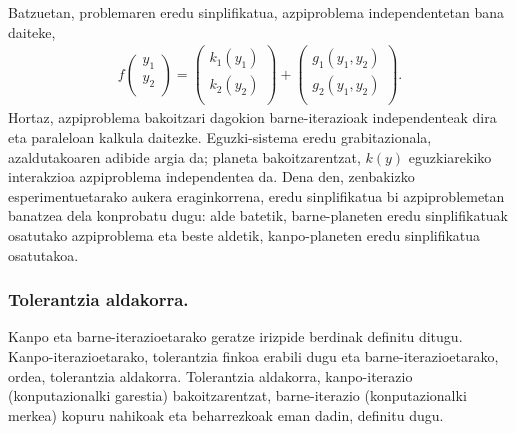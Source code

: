 Batzuetan, problemaren eredu sinplifikatua, azpiproblema independentetan bana daiteke,
\begin{align*}
f\left ( \begin{array}{c}
   y_1 \\
   y_2 \\
\end{array} \right)=
\left ( \begin{array}{c}
   k_1(y_1) \\
   k_2(y_2) \\
\end{array} \right)+
\left ( \begin{array}{c}
   g_1(y_1,y_2) \\
   g_2(y_1,y_2) \\
\end{array} \right).
\end{align*}
%
Hortaz, azpiproblema bakoitzari dagokion barne-iterazioak independenteak dira eta paraleloan kalkula daitezke. Eguzki-sistema eredu grabitazionala, azaldutakoaren adibide argia da; planeta bakoitzarentzat, $k(y)$ eguzkiarekiko interakzioa azpiproblema independentea da. Dena den, zenbakizko esperimentuetarako aukera eraginkorrena, eredu sinplifikatua bi azpiproblemetan banatzea dela konprobatu dugu: alde batetik, barne-planeten eredu sinplifikatuak osatutako azpiproblema eta beste aldetik, kanpo-planeten eredu sinplifikatua osatutakoa.    

\subsubsection*{Tolerantzia aldakorra.}

Kanpo eta barne-iterazioetarako geratze irizpide berdinak definitu ditugu. Kanpo-iterazioetarako, tolerantzia finkoa erabili dugu eta barne-iterazioetarako, ordea, tolerantzia aldakorra. Tolerantzia aldakorra, kanpo-iterazio (konputazionalki garestia) bakoitzarentzat, barne-iterazio (konputazionalki merkea) kopuru nahikoak eta beharrezkoak eman dadin, definitu dugu.     
 

